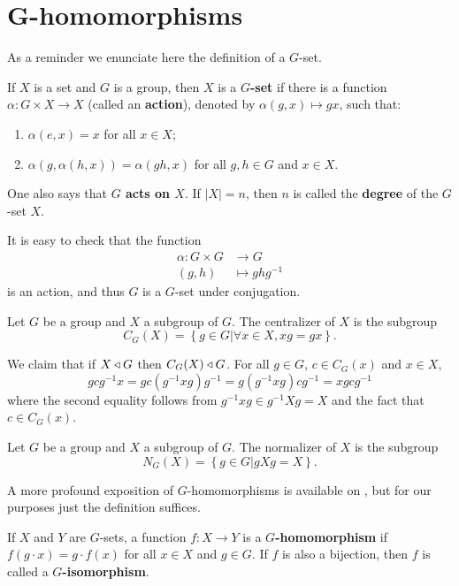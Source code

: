\section{G-homomorphisms}

As a reminder we enunciate here the definition of a $G$-set.

\begin{definition}
    \cite{RotmanITG}
    If $X$ is a set and $G$ is a group, then $X$ is a \textbf{$G$-set} if there is a function $\alpha : G \times X \to X$ (called an \textbf{action}), denoted by $\alpha(g, x) \mapsto gx$, such that:
    \begin{enumerate}
    \item $\alpha(e, x) = x$ for all $x \in X$;
    \item $\alpha(g, \alpha(h, x)) = \alpha(gh, x)$ for all $g, h \in G$ and $x \in X$.
    \end{enumerate}
    One also says that \textbf{$G$ acts on $X$}. If $|X| = n$, then $n$ is called the \textbf{degree} of the $G$-set $X$.
\end{definition}

It is easy to check that the function 
\begin{align*}
    \alpha \colon G \times G &\rightarrow G \\
    (g,h) &\mapsto ghg^{-1}
\end{align*} is an action, and thus $G$ is a $G$-set under conjugation. 

\begin{definition}
    Let $G$ be a group and $X$ a subgroup of $G$. The centralizer of $X$ is the subgroup
    $$
    C_G(X) = \left\{ g \in G | \forall x \in X, xg = gx \right\}.
    $$
\end{definition}

We claim that if $X \triangleleft G$ then $C_G(X) \triangleleft G$. For all $g \in G$, $c \in C_G(x)$ and $x \in X$,
$$
gcg^{-1}x = gc(g^{-1}xg)g^{-1} = g(g^{-1}xg)cg^{-1} = xgcg^{-1} 
$$
where the second equality follows from $g^{-1}xg \in g^{-1}Xg = X$ and the fact that $c \in C_G(x)$.

\begin{definition}
    Let $G$ be a group and $X$ a subgroup of $G$. The normalizer of $X$ is the subgroup
    $$
    N_G(X) = \left\{ g \in G | gXg = X \right\}.
    $$
\end{definition}

A more profound exposition of $G$-homomorphisms is available on \cite[Chapter 9]{RotmanITG}, but for our purposes just the definition suffices.

\begin{definition}
    If $X$ and $Y$ are $G$-sets, a function $f: X \rightarrow Y$ is a \textbf{$G$-homomorphism} if $f(g \cdot x) = g \cdot f(x)$ for all $x \in X$ and $g \in G$. If $f$ is also a bijection, then $f$ is called a \textbf{$G$-isomorphism}.

\end{definition}
